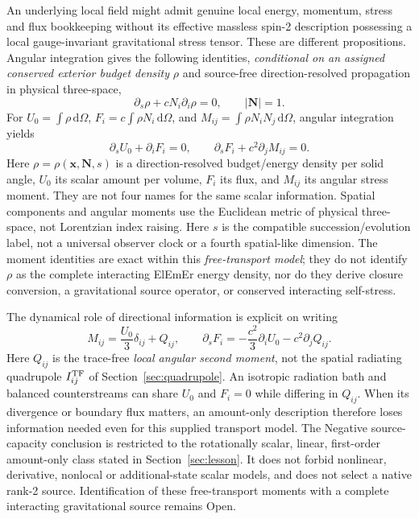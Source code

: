 \documentclass[11pt]{article}
\newcommand{\ElEmEr}{\mbox{ElEmEr}}
\newcommand{\cmc}{c}
\theoremstyle{plain}
\theoremstyle{remark}
\begin{document}
An underlying local field might admit genuine local energy, momentum, stress
and flux bookkeeping without its effective massless spin-2 description
possessing a local gauge-invariant gravitational stress tensor.  These are
different propositions.  Angular integration gives the following identities,
\emph{conditional on an assigned conserved exterior budget density} $\rho$
and source-free direction-resolved propagation in physical three-space,
\begin{equation}
\partial_s\rho+\cmc N_i\partial_i\rho=0,\qquad|\mathbf N|=1.
\label{eq:conditional-free-transport}
\end{equation}
For $U_0=\int\rho\,\mathrm d\Omega$,
$F_i=\cmc\int\rho N_i\,\mathrm d\Omega$, and
$M_{ij}=\int\rho N_iN_j\,\mathrm d\Omega$, angular integration yields
\begin{equation}
\boxed{\partial_s U_0+\partial_iF_i=0,\qquad
\partial_s F_i+\cmc^2\partial_jM_{ij}=0.}
\label{eq:free-transport-moments}
\end{equation}
Here $\rho=\rho(\mathbf x,\mathbf N,s)$ is a direction-resolved budget/energy
density per solid angle, $U_0$ its scalar amount per volume, $F_i$ its flux,
and $M_{ij}$ its angular stress moment.  They are not four names for the
same scalar information.  Spatial components and angular moments use the
Euclidean metric of physical three-space, not Lorentzian index raising.
Here $s$ is the compatible succession/evolution label, not a universal
observer clock or a fourth spatial-like dimension.  The moment identities
are exact within this \emph{free-transport model}; they do not identify
$\rho$ as the complete interacting \ElEmEr{} energy density, nor do they
derive closure conversion, a gravitational source operator, or conserved
interacting self-stress.

The dynamical role of directional information is explicit on writing
\begin{equation}
 M_{ij}=\frac{U_0}{3}\delta_{ij}+Q_{ij},\qquad
 \partial_sF_i
 =-\frac{\cmc^2}{3}\partial_iU_0-\cmc^2\partial_jQ_{ij}.
 \label{eq:source-anisotropy-moment}
\end{equation}
Here $Q_{ij}$ is the trace-free \emph{local angular second moment},
not the spatial radiating quadrupole $I_{ij}^{\rm TF}$ of
Section~\ref{sec:quadrupole}.  An isotropic radiation bath and balanced
counterstreams can share $U_0$ and $F_i=0$ while differing in $Q_{ij}$.
When its divergence or boundary flux matters, an amount-only description
therefore loses information needed even for this supplied transport model.
The Negative source-capacity conclusion is restricted to the rotationally
scalar, linear, first-order amount-only class stated in Section~\ref{sec:lesson}.
It does not forbid nonlinear, derivative, nonlocal or additional-state scalar
models, and does not select a native rank-2 source.  Identification of these
free-transport moments with a complete interacting gravitational source
remains Open.
\end{document}
